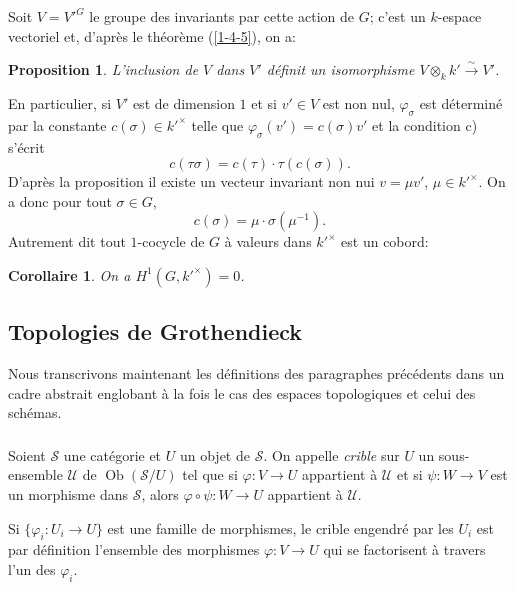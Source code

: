 \documentclass{article}
\DeclareMathOperator{\ob}{Ob}
\newcommand{\cS}{\mathcal{S}}
\newcommand{\cU}{\mathcal{U}}
\newcommand{\iso}{\xrightarrow\sim}
\newtheorem{proposition}[subsubsection]{Proposition}
\newtheorem{corollary}[subsubsection]{Corollaire}
\begin{document}
Soit $V={V'}^G$ le groupe des invariants par cette action de $G$; c'est un 
$k$-espace vectoriel et, d'après le théorème (\ref{1-4-5}), on a:

\begin{proposition}\label{1-5-2}
L'inclusion de $V$ dans $V'$ définit un isomorphisme 
$V\otimes_k k' \iso V'$.
\end{proposition}

En particulier, si $V'$ est de dimension $1$ et si $v'\in V$ est non nul, 
$\varphi_\sigma$ est déterminé par la constante 
$c(\sigma)\in {k'}^\times$ telle que $\varphi_\sigma(v')=c(\sigma)v'$ et la 
condition c) s'écrit 
\[
  c(\tau\sigma) = c(\tau)\cdot \tau(c(\sigma))\text{.}
\]
D'après la proposition il existe un vecteur invariant non nui 
$v=\mu v'$, $\mu\in {k'}^\times$. On a donc pour tout $\sigma\in G$, 
\[
  c(\sigma) = \mu\cdot \sigma(\mu^{-1})\text{.}
\]
Autrement dit tout $1$-cocycle de $G$ à valeurs dans ${k'}^\times$ est un 
cobord: 

\begin{corollary}\label{1-5-3}
On a $H^1(G,{k'}^\times)=0$.
\end{corollary}










\subsection{Topologies de Grothendieck}\label{1-6}

Nous transcrivons maintenant les définitions des paragraphes précédents 
dans un cadre abstrait englobant à la fois le cas des espaces topologiques 
et celui des schémas. 





\subsubsection{}\label{1-6-1}

Soient $\cS$ une catégorie et $U$ un objet de $\cS$. On appelle \emph{crible} 
sur $U$ un sous-ensemble $\cU$ de $\ob(\cS/U)$ tel que si $\varphi:V\to U$ 
appartient à $\cU$ et si $\psi:W\to V$ est un morphisme dans $\cS$, alors 
$\varphi\circ\psi:W\to U$ appartient à $\cU$. 

Si $\{\varphi_i:U_i\to U\}$ est une famille de morphismes, le crible 
engendré par les $U_i$ est par définition l'ensemble des morphismes 
$\varphi:V\to U$ qui se factorisent à travers l'un des $\varphi_i$. 
\end{document}
